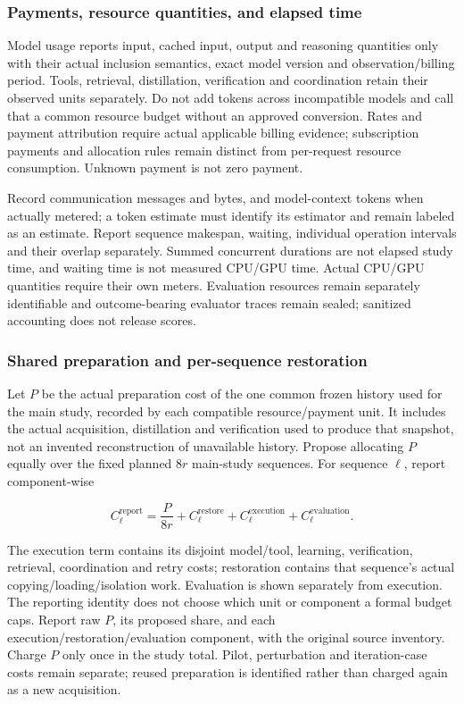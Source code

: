 \documentclass[
  english,
  11pt,
]{article}
\begin{document}
\subsubsection{Payments, resource quantities, and elapsed
time}\label{payments-resource-quantities-and-elapsed-time}

Model usage reports input, cached input, output and reasoning quantities
only with their actual inclusion semantics, exact model version and
observation/billing period. Tools, retrieval, distillation, verification
and coordination retain their observed units separately. Do not add
tokens across incompatible models and call that a common resource budget
without an approved conversion. Rates and payment attribution require
actual applicable billing evidence; subscription payments and allocation
rules remain distinct from per-request resource consumption. Unknown
payment is not zero payment.

Record communication messages and bytes, and model-context tokens when
actually metered; a token estimate must identify its estimator and
remain labeled as an estimate. Report sequence makespan, waiting,
individual operation intervals and their overlap separately. Summed
concurrent durations are not elapsed study time, and waiting time is not
measured CPU/GPU time. Actual CPU/GPU quantities require their own
meters. Evaluation resources remain separately identifiable and
outcome-bearing evaluator traces remain sealed; sanitized accounting
does not release scores.

\subsubsection{Shared preparation and per-sequence
restoration}\label{shared-preparation-and-per-sequence-restoration}

Let \(P\) be the actual preparation cost of the one common frozen
history used for the main study, recorded by each compatible
resource/payment unit. It includes the actual acquisition, distillation
and verification used to produce that snapshot, not an invented
reconstruction of unavailable history. Propose allocating \(P\) equally
over the fixed planned \(8r\) main-study sequences. For sequence
\(\ell\), report component-wise

\[
C_\ell^{\mathrm{report}}=
\frac{P}{8r}+C_\ell^{\mathrm{restore}}
+C_\ell^{\mathrm{execution}}+C_\ell^{\mathrm{evaluation}}.
\]

The execution term contains its disjoint model/tool, learning,
verification, retrieval, coordination and retry costs; restoration
contains that sequence's actual copying/loading/isolation work.
Evaluation is shown separately from execution. The reporting identity
does not choose which unit or component a formal budget caps. Report raw
\(P\), its proposed share, and each execution/restoration/evaluation
component, with the original source inventory. Charge \(P\) only once in
the study total. Pilot, perturbation and iteration-case costs remain
separate; reused preparation is identified rather than charged again as
a new acquisition.
\end{document}
